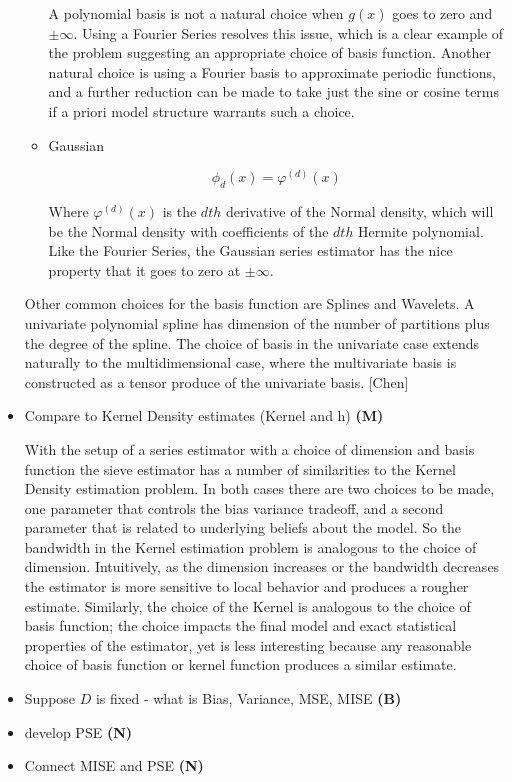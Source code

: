 \documentclass[12pt]{article}  %
\begin{document}
\begin{itemize}
\begin{itemize}
A polynomial basis is not a natural choice when $g(x)$ goes to zero and $\pm \infty$. Using a Fourier Series resolves this issue, which is a clear example of the problem suggesting an appropriate choice of basis function.  Another natural choice is using a Fourier basis to approximate periodic functions, and a further reduction can be made to take just the sine or cosine terms if a priori model structure warrants such a choice.

\item Gaussian 

$$  \phi_d(x) = \varphi^{(d)}(x)$$

Where $\varphi^{(d)}(x)$ is the $dth$ derivative of the Normal density, which will be the Normal density with coefficients  of the $dth$ Hermite polynomial. Like the Fourier Series, the Gaussian series estimator has the nice property that it goes to zero at $\pm \infty$.

\end{itemize}

Other common choices for the basis function are Splines and Wavelets. A univariate polynomial spline has dimension of the number of partitions plus the degree of the spline.  The choice of basis in the univariate case extends naturally to the multidimensional case, where the multivariate basis is constructed as a tensor produce of the univariate basis. [Chen]



\item Compare to Kernel Density estimates (Kernel and h) \textbf{(M)}

With the setup of a series estimator with a choice of dimension and basis function the sieve estimator has a number of similarities to the Kernel Density estimation problem.  In both cases there are two choices to be made, one parameter that controls the bias variance tradeoff, and a second parameter that is related to underlying beliefs about the model.  So the bandwidth in the Kernel estimation problem is analogous to the choice of dimension. Intuitively, as the dimension increases or the bandwidth decreases the estimator is more sensitive to local behavior and produces a rougher estimate. Similarly, the choice of the Kernel is analogous to the choice of basis function; the choice impacts the final model and exact statistical properties of the estimator, yet is less interesting because any reasonable choice of basis function or kernel function produces a similar estimate. 

\item Suppose $D$ is fixed - what is Bias, Variance, MSE, MISE \textbf{(B)}
\item develop PSE \textbf{(N)}
\item Connect MISE and PSE \textbf{(N)}
\end{itemize}
\end{document}
